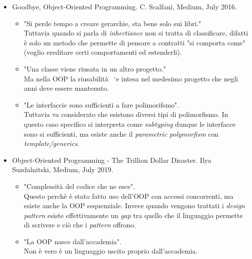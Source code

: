 \documentclass[10pt,a4paper]{book}
\begin{document}
\begin{itemize}
\item Goodbye, Object-Oriented Programming. C. Scalfani, Medium, July 2016.
\begin{itemize}
\item "Si perde tempo a creare gerarchie, sta bene solo sui libri."\\
Tuttavia quando si parla di \textit{inhertiance} non si tratta di classificare, difatti \`e solo un metodo che permette di pensare a contratti "si comporta come" (voglio ereditare certi comportamenti ed estenderli).
\item "Una classe viene riusata in un altro progetto."\\
Ma nella OOP la riusabilit\`a \	`e intesa nel medesimo progetto che negli anni deve essere mantenuto.
\item "Le interfaccie sono sufficienti a fare polimorifsmo".\\
Tuttavia va considerato che esistono diversi tipi di polimorfismo. In questo caso specifico si interpreta come \textit{subtyping} dunque le interfacce sono si sufficienti, ma esiste anche il \textit{parametric polymorfism} con \textit{template/generics}.
\end{itemize}
\item Object-Oriented Programming - The Trillion Dollar Disaster. Ilya Suzdalnitski, Medium, July 2019.
\begin{itemize}
\item "Complessit\`a del codice che ne esce".\\
Questo perch\`e \`e stato fatto uso dell'OOP con accessi concorrenti, ma esiste anche la OOP sequenziale. Invece quando vengono trattati i \textit{design pattern} esiste effettivamente un \textit{gap} tra quello che il linguaggio permette di scrivere e ci\`o che i \textit{pattern} offrono.
\item "La OOP nasce dall'accademia".\\
Non \`e vero \`e un linguaggio uscito proprio dall'accademia.
\end{itemize}
\end{itemize}
\noindent
\end{document}

